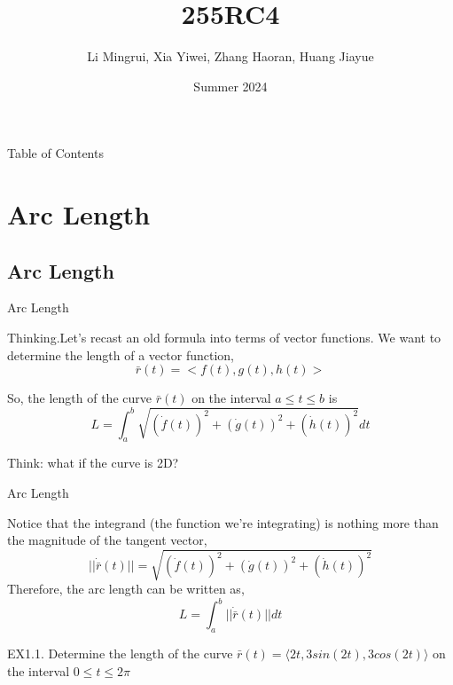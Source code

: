 \documentclass[aspectratio=169, UTF8]{ctexbeamer}
\title{\LARGE 255RC4}
\author{ Li Mingrui, Xia Yiwei, Zhang Haoran, Huang Jiayue}
\date{Summer 2024}
\begin{document}
\maketitle


\begin{frame}[t]{Table of Contents}
        \tableofcontents
    \end{frame}



    \section{Arc Length}
    
    \subsection{Arc Length}
    \begin{frame}[t]{Arc Length}
        \begin{block}
            \par \textcolor{yy}{Thinking.}Let's recast an old formula into terms of vector functions. We want to determine the length of a vector function,
            \begin{equation*}
                 \bar{r} (t) = <f(t) , g(t)  , h(t) >
            \end{equation*}
             
    So, the length of the curve  $\bar{r} (t) $  on the interval $ a \le t \le b $  is
    \begin{equation*}
        L = \int_{a}^{b}{\sqrt{(\dot{f}(t))^2 + (\dot{g}(t))^2 + (\dot{h}(t))^2}dt}
    \end{equation*}
   
        \end{block}
    Think: what if the curve is 2D?
    \end{frame}
    
    \begin{frame}{Arc Length}
        \begin{block}
        \par Notice that the integrand (the function we’re integrating) is nothing more than the magnitude of the tangent vector,
    \begin{equation*}
        ||\dot{\bar{r}}(t)|| = \sqrt{(\dot{f}(t))^2 + (\dot{g}(t))^2 + (\dot{h}(t))^2}
    \end{equation*}
    Therefore, the arc length can be written as,
    \begin{equation*}
        L = \int_{a}^{b}{||\dot{\bar{r}}(t)||dt}
    \end{equation*}
        \end{block}
    \par \textcolor{yy}{EX1.1.}
       Determine the length of the curve $\bar{r} (t) =⟨2t,3sin(2t),3cos(2t)⟩$ on the interval  $0 \le t \le 2\pi$
    \end{frame}
    
\end{document}
